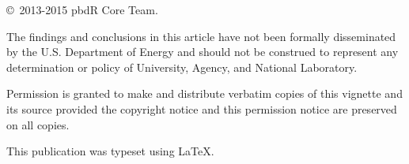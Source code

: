 \null
\vfill
\copyright\ 2013-2015 pbdR Core Team.

The findings and conclusions in this article have not been
formally disseminated by the U.S. Department of Energy
and should not be construed to represent any determination or
policy of University, Agency, and National Laboratory.

Permission is granted to make and distribute verbatim copies of
this vignette and its source provided the copyright notice and
this permission notice are preserved on all copies.

This publication was typeset using \LaTeX.
